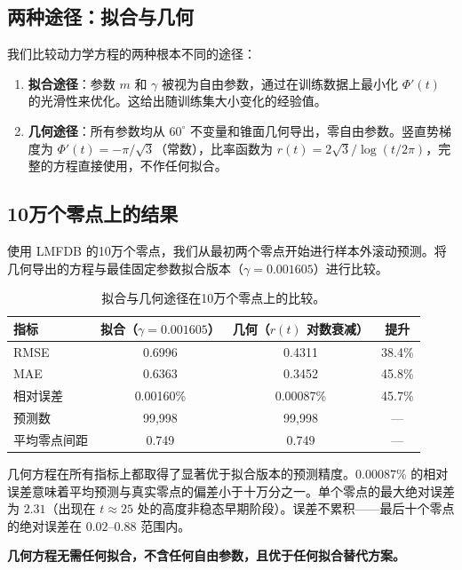 \documentclass[12pt,a4paper]{article}
\begin{document}
\subsection{两种途径：拟合与几何}

我们比较动力学方程的两种根本不同的途径：

\begin{enumerate}
\item \textbf{拟合途径}：参数 $m$ 和 $\gamma$ 被视为自由参数，通过在训练数据上最小化 $\Phi'(t)$ 的光滑性来优化。这给出随训练集大小变化的经验值。
\item \textbf{几何途径}：所有参数均从 $60^\circ$ 不变量和锥面几何导出，零自由参数。竖直势梯度为 $\Phi'(t) = -\pi/\sqrt{3}$（常数），比率函数为 $r(t) = 2\sqrt{3}/\log(t/2\pi)$，完整的方程直接使用，不作任何拟合。
\end{enumerate}

\subsection{10万个零点上的结果}

使用 LMFDB \cite{lmfdb} 的10万个零点，我们从最初两个零点开始进行样本外滚动预测。将几何导出的方程与最佳固定参数拟合版本（$\gamma = 0.001605$）进行比较。

\begin{table}[h]
\centering
\begin{tabular}{lccc}
\hline
\textbf{指标} & \textbf{拟合（$\gamma=0.001605$）} & \textbf{几何（$r(t)$ 对数衰减）} & \textbf{提升} \\
\hline
RMSE & 0.6996 & 0.4311 & 38.4\% \\
MAE & 0.6363 & 0.3452 & 45.8\% \\
相对误差 & 0.00160\% & 0.00087\% & 45.7\% \\
预测数 & 99,998 & 99,998 & --- \\
平均零点间距 & 0.749 & 0.749 & --- \\
\hline
\end{tabular}
\caption{拟合与几何途径在10万个零点上的比较。}
\label{tab:comparison}
\end{table}

几何方程在所有指标上都取得了显著优于拟合版本的预测精度。$0.00087\%$ 的相对误差意味着平均预测与真实零点的偏差小于十万分之一。单个零点的最大绝对误差为 $2.31$（出现在 $t \approx 25$ 处的高度非稳态早期阶段）。误差不累积——最后十个零点的绝对误差在 $0.02$--$0.88$ 范围内。

\textbf{几何方程无需任何拟合，不含任何自由参数，且优于任何拟合替代方案。}
\end{document}

